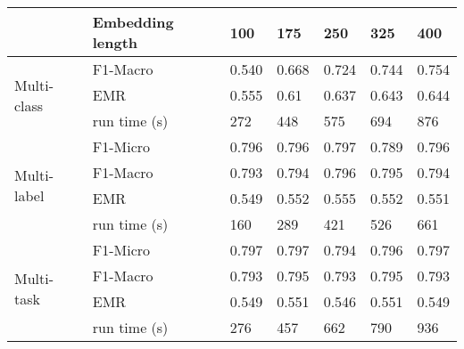 
\begin{tabular}{@{}lllllll@{}}
\toprule
                             & Embedding length & 100   & 175   & 250   & 325   & 400    \\ \midrule
\multirow{3}{*}{Multi-class} & F1-Macro         & 0.540  & 0.668 & 0.724 & 0.744 & 0.754  \\
                             & EMR              & 0.555 & 0.61  & 0.637 & 0.643 & 0.644  \\
                             & run time (s)     & 272   & 448   & 575   & 694   & 876    \\ \cmidrule(l){2-7} 
\multirow{4}{*}{Multi-label} & F1-Micro         & 0.796 & 0.796 & 0.797 & 0.789 & 0.796  \\
                             & F1-Macro         & 0.793 & 0.794 & 0.796 & 0.795 & 0.794  \\
                             & EMR              & 0.549 & 0.552 & 0.555 & 0.552 & 0.551  \\
                             & run time (s)     & 160   & 289   & 421   & 526   & 661    \\ \cmidrule(l){2-7} 
\multirow{4}{*}{Multi-task}  & F1-Micro         & 0.797 & 0.797 & 0.794 & 0.796 & 0.797  \\
							 & F1-Macro         & 0.793 & 0.795 & 0.793 & 0.795 & 0.793 \\
                             & EMR              & 0.549 & 0.551 & 0.546 & 0.551 & 0.549  \\
                             & run time (s)     & 276   & 457   & 662   & 790   & 936    \\ \cmidrule(l){2-7} 
\end{tabular}
